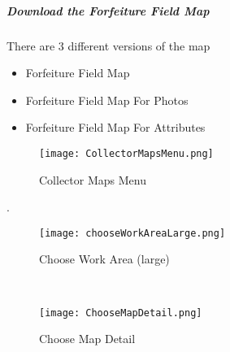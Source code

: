   \vspace{1in}


  \clearpage
  \subparagraph[Download the Forfeiture Field Map]{Download the Forfeiture Field Map \texorpdfstring{\\}{}}
  \noindent There are 3 different versions of the map
  \vspace{.05in}

  \begin{itemize}
  \item Forfeiture Field Map
  \item Forfeiture Field Map For Photos
  \item Forfeiture Field Map For Attributes
  \end{itemize}

  \begin{wrapfigure}{r}{0.6\textwidth}
  \centering
      \texttt{[image: CollectorMapsMenu.png]}
  \caption{Collector Maps Menu}
  \end{wrapfigure}
 .
  \vspace{.5in}

  \vspace{1.75in}


  \begin{flushright}
\lookArrow
\end{flushright}
  \clearpage
  \begin{wrapfigure}{r}{0.6\textwidth}
  \centering
      \texttt{[image: chooseWorkAreaLarge.png]}
  \caption{Choose Work Area (large)}
  
  \HRule \\[.4cm] %
  \vspace{.1in}

      \texttt{[image: ChooseMapDetail.png]}
  \caption{Choose Map Detail}
  \vspace{-.1in}

  \end{wrapfigure}

  \vspace{1in}

